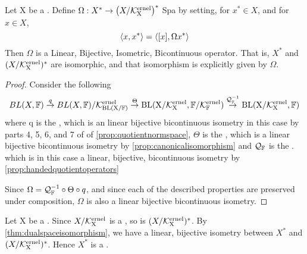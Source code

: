 \begin{thm}
\label{thm:dualspaceisomorphism}
    Let X be a 
    \SeminormedSpace.
    Define $\Omega:X^* \to \left( X/\bf\mathcal{K}\rm^{ernel}_X\right)^*$
Spa    by setting, for $x^* \in X$, 
    and for $x \in X$, 
    \begin{equation}
        \left\langle x, x^* \right\rangle = \left\langle [x], \Omega x^* \right\rangle
    \end{equation}
    Then $\Omega$ is a 
    Linear, 
    Bijective, 
    Isometric, 
    Bicontinuous operator. 
    That is, $X^*$ and $(X/\bf\mathcal{K}\rm^{ernel}_X)^*$ are 
    isomorphic, and that isomorphism is explicitly
    given by $\Omega$. 
    \begin{proof}
        Consider the following
        \begin{equation}
            BL(X,\mathbb{F}) \overset{q}{\to} BL(X,\mathbb{F})/\bf\mathcal{K}\rm^{ernel}_{BL(X/\mathbb{F})} \overset{\Theta}{\to} BL(X/\bf\mathcal{K}\rm^{ernel}_X, \mathbb{F}/\bf\mathcal{K}\rm^{ernel}_{\mathbb{F}}) \overset{\mathcal{Q}_{\mathbb{F}}^{-1}}{\to} BL(X/\bf\mathcal{K}\rm^{ernel}_X,\mathbb{F})
        \end{equation}
        where
        q is the \QuotientMap, 
        which is an linear bijective bicontinuous isometry in this case
        by parts 4, 5, 6, and 7 of 
        of \ref{prop:quotientnormspace}, 
        $\Theta$ is the \CanonicalIso, 
        which is a linear bijective bicontinuous isometry by 
        \ref{prop:canonicalisomorphism}
        and $\mathcal{Q}_{\mathbb{F}}$ is the \CodomainQuotientMap.
        which is in this case a linear, bijective, bicontinuous isometry
        by \ref{prop:handedquotientoperators}


        Since $\Omega=\mathcal{Q}_{\mathbb{F}}^{-1} \circ \Theta \circ q$, 
        and since each of the described properties
        are preserved under composition, 
        $\Omega$ is also a 
        linear bijective bicontinuous isometry. 
    \end{proof}
\end{thm}

\begin{rmk}
\label{rmk:dualspaceisnormedspace}
	Let X be a 
	\SeminormedSpace.
	Since $X/\bf\mathcal{K}\rm^{ernel}_X$
	is a \NormedSpace, 
	so is $(X/\bf\mathcal{K}\rm^{ernel}_X)^*$. 
	By 
	\ref{thm:dualspaceisomorphism}, 
	we have a
	linear, bijective isometry
	between $X^*$
	and 
	$(X/\bf\mathcal{K}\rm^{ernel}_X)^*$. 
	Hence $X^*$ is a \NormedSpace. 
\end{rmk}
